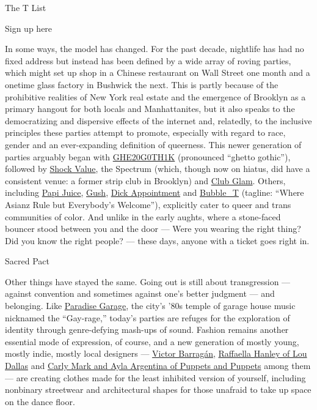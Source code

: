 The T List \textbar{}

Sign up here

In some ways, the model has changed. For the past decade, nightlife has
had no fixed address but instead has been defined by a wide array of
roving parties, which might set up shop in a Chinese restaurant on Wall
Street one month and a onetime glass factory in Bushwick the next. This
is partly because of the prohibitive realities of New York real estate
and the emergence of Brooklyn as a primary hangout for both locals and
Manhattanites, but it also speaks to the democratizing and dispersive
effects of the internet and, relatedly, to the inclusive principles
these parties attempt to promote, especially with regard to race, gender
and an ever-expanding definition of queerness. This newer generation of
parties arguably began with
\href{https://www.instagram.com/ghe20g0th1k/?hl=en}{GHE20G0TH1K}
(pronounced ``ghetto gothic''), followed by
\href{https://www.facebookcorewwwi.onion/SHOCKVALUENYC/}{Shock Value},
the Spectrum (which, though now on hiatus, did have a consistent venue:
a former strip club in Brooklyn) and
\href{http://officemagazine.net/not-just-party-club-glam}{Club Glam}.
Others, including
\href{https://www.instagram.com/papijuicebk/?hl=en}{Papi Juice},
\href{https://www.instagram.com/gushofficial/?hl=en}{Gush},
\href{https://www.instagram.com/dickappointment__/?hl=en}{Dick
Appointment} and
\href{https://www.instagram.com/bubble____t/?hl=en}{Bubble\_T} (tagline:
``Where Asianz Rule but Everybody's Welcome''), explicitly cater to
queer and trans communities of color. And unlike in the early aughts,
where a stone-faced bouncer stood between you and the door --- Were you
wearing the right thing? Did you know the right people? --- these days,
anyone with a ticket goes right in.

 Sacred Pact

Other things have stayed the same. Going out is still about
transgression --- against convention and sometimes against one's better
judgment --- and belonging. Like
\href{https://tmagazine.blogs.nytimes3xbfgragh.onion/2014/05/09/flashback-memories-of-the-paradise-garage-larry-levan-street-party/}{Paradise
Garage}, the city's '80s temple of garage house music nicknamed the
``Gay-rage,'' today's parties are refuges for the exploration of
identity through genre-defying mash-ups of sound. Fashion remains
another essential mode of expression, of course, and a new generation of
mostly young, mostly indie, mostly local designers ---
\href{http://www.barragannnn.com/collections}{Victor Barragán},
\href{https://www.nytimes3xbfgragh.onion/2018/09/12/t-magazine/lou-dallas-fashion-brand-raffaella-hanley.html}{Raffaella
Hanley of Lou Dallas} and
\href{https://www.nytimes3xbfgragh.onion/2019/09/06/t-magazine/new-fashion-designers-susan-fang-super-yaya.html}{Carly
Mark and Ayla Argentina of Puppets and Puppets} among them --- are
creating clothes made for the least inhibited version of yourself,
including nonbinary streetwear and architectural shapes for those
unafraid to take up space on the dance floor.

